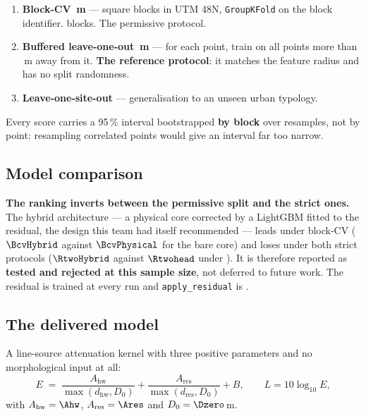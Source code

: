 \documentclass[11pt,a4paper]{article}
\begin{document}
\begin{enumerate}
  \item \textbf{Block-CV \blockM\,m} --- square blocks in UTM 48N,
        \texttt{GroupKFold} on the block identifier. \nBlocks{} blocks. The
        permissive protocol.
  \item \textbf{Buffered leave-one-out \bufferM\,m} --- for each point, train on
        all points more than \bufferM\,m away from it. \textbf{The reference
        protocol}: it matches the feature radius and has no split randomness.
  \item \textbf{Leave-one-site-out} --- generalisation to an unseen urban
        typology.
\end{enumerate}

\noindent
Every score carries a 95\,\% interval bootstrapped \textbf{by block} over
\nBootstrap{} resamples, not by point: resampling correlated points would give an
interval far too narrow.

\subsection{Model comparison}

\begin{table}[h]
  \centering\small
  
  \caption{All models on identical splits. The delivered model is in bold and is
  selected \textbf{by code} under the reference protocol; the choice is written
  into \texttt{models/metrics.json} and read by the export, so nothing downstream
  can silently substitute another.}
\end{table}

\noindent
\textbf{The ranking inverts between the permissive split and the strict ones.}
The hybrid architecture --- a physical core corrected by a LightGBM fitted to the
residual, the design this team had itself recommended --- leads under block-CV
($\BcvHybrid$ against $\BcvPhysical$ for the bare core) and loses under both
strict protocols ($\RtwoHybrid$ against $\Rtwohead$ under ). It is
therefore reported as \textbf{tested and rejected at this sample size}, not
deferred to future work. The residual is trained at every run and
\texttt{apply\_residual} is \applyResid{}.

\subsection{The delivered model}

A line-source attenuation kernel with three positive parameters and no
morphological input at all:
\[
  E \;=\; \frac{A_\mathrm{hw}}{\max(d_\mathrm{hw}, D_0)}
        + \frac{A_\mathrm{res}}{\max(d_\mathrm{res}, D_0)} + B,
  \qquad L = 10\log_{10} E,
\]
with $A_\mathrm{hw} = \Ahw$, $A_\mathrm{res} = \Ares$ and $D_0 = \Dzero$\,m.
\end{document}
